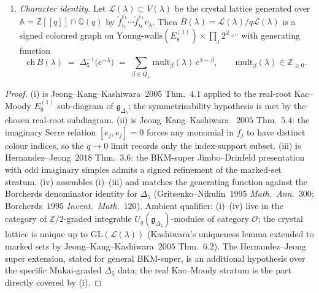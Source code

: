 \begin{proposition}
\begin{enumerate}[label=\textup{(\roman*)}]
Kashiwara operator.
\item \emph{Character identity.} Let
$\mathscr L(\lambda) \subset V(\lambda)$ be the crystal lattice
generated over $\mathbb A = \mathbb Z[[q]] \cap \mathbb Q(q)$ by
$\tilde f_{i_1}^{\varepsilon_1} \cdots \tilde f_{i_k}^{\varepsilon_k}
v_\lambda$. Then $B(\lambda) =
\mathscr L(\lambda)/q\mathscr L(\lambda)$ is a signed coloured graph
on $\mathrm{Young\text{-}walls}(E_8^{(1)}) \times
\prod_j 2^{\mathbb Z_{\geq 0}}$ with generating function
\begin{equation}
\label{eq:k3qt-crystal-character-g-delta5}
\mathrm{ch}\, B(\lambda) \;=\;
\Delta_5^{-1}\bigl(e^{-\lambda}\bigr)
\;=\;
\sum_{\beta \in Q_+} \mathrm{mult}_\beta(\lambda)\, e^{\lambda - \beta},
\qquad
\mathrm{mult}_\beta(\lambda) \in \mathbb Z_{\geq 0}.
\end{equation}
\end{enumerate}
\end{proposition}

\begin{proof}
(i) is Jeong--Kang--Kashiwara~$2005$ Thm.~$4.1$ applied to the
real-root Kac--Moody $E_8^{(1)}$ sub-diagram of
$\mathfrak g_{\Delta_5}$; the symmetrisability hypothesis is met by
the chosen real-root subdiagram. (ii) is Jeong--Kang--Kashiwara~
$2005$ Thm.~$5.4$: the imaginary Serre relation $[e_j, e_j] = 0$
forces any monomial in $f_j$ to have distinct colour indices, so the
$q \to 0$ limit records only the index-support subset. (iii) is
Hernandez--Jeong~$2018$ Thm.~$3.6$: the BKM-super Jimbo--Drinfeld
presentation with odd imaginary simples admits a signed refinement of
the marked-set stratum. (iv) assembles (i)--(iii) and matches the
generating function against the Borcherds denominator identity for
$\Delta_5$ (Gritsenko--Nikulin~$1995$ \emph{Math.~Ann.}~$300$;
Borcherds~$1995$ \emph{Invent.~Math.}~$120$). Ambient qualifier:
(i)--(iv) live in the category of $\mathbb Z/2$-graded integrable
$U_q(\mathfrak g_{\Delta_5})$-modules of category $\mathcal O$; the
crystal lattice is unique up to $\mathrm{GL}(\mathscr L(\lambda))$
(Kashiwara's uniqueness lemma extended to marked sets by
Jeong--Kang--Kashiwara~$2005$ Thm.~$6.2$). The Hernandez--Jeong super
extension, stated for general BKM-super, is an additional hypothesis
over the specific Mukai-graded $\Delta_5$ data; the real Kac--Moody
stratum is the part directly covered by (i).
\end{proof}

